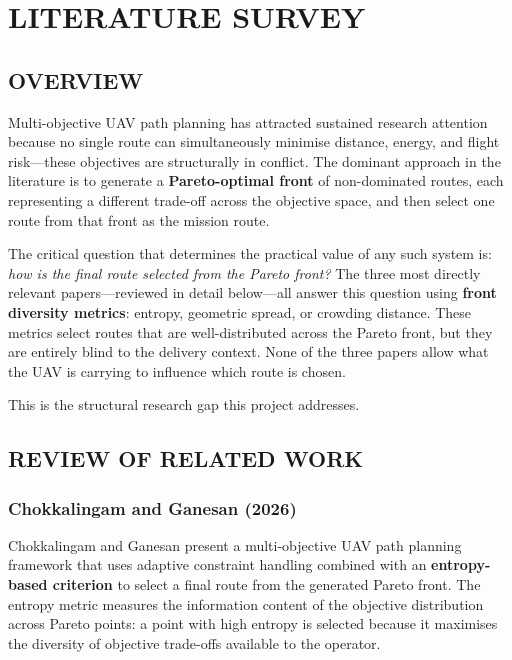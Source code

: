 
\chapter{LITERATURE SURVEY}

\section{OVERVIEW}

Multi-objective UAV path planning has attracted sustained research attention because no
single route can simultaneously minimise distance, energy, and flight risk---these
objectives are structurally in conflict. The dominant approach in the literature is to
generate a \textbf{Pareto-optimal front} of non-dominated routes, each representing a
different trade-off across the objective space, and then select one route from that front
as the mission route.

The critical question that determines the practical value of any such system is:
\textit{how is the final route selected from the Pareto front?} The three most directly
relevant papers---reviewed in detail below---all answer this question using
\textbf{front diversity metrics}: entropy, geometric spread, or crowding distance. These
metrics select routes that are well-distributed across the Pareto front, but they are
entirely blind to the delivery context. None of the three papers allow what the UAV is
carrying to influence which route is chosen.

This is the structural research gap this project addresses.

\section{REVIEW OF RELATED WORK}

\subsection{Chokkalingam and Ganesan (2026)}

Chokkalingam and Ganesan \cite{chokkalingam2026} present a multi-objective UAV path
planning framework that uses adaptive constraint handling combined with an
\textbf{entropy-based criterion} to select a final route from the generated Pareto front.
The entropy metric measures the information content of the objective distribution across
Pareto points: a point with high entropy is selected because it maximises the diversity
of objective trade-offs available to the operator.

